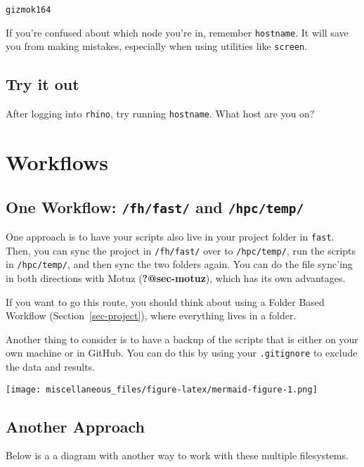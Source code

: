 \documentclass[
  letterpaper,
  DIV=11,
  numbers=noendperiod]{scrreprt}
\begin{document}
\begin{verbatim}
gizmok164
\end{verbatim}

If you're confused about which node you're in, remember
\texttt{hostname}. It will save you from making mistakes, especially
when using utilities like \texttt{screen}.

\subsection{Try it out}\label{try-it-out-4}

After logging into \texttt{rhino}, try running \texttt{hostname}. What
host are you on?

\section{Workflows}\label{workflows}

\subsection{\texorpdfstring{One Workflow: \texttt{/fh/fast/} and
\texttt{/hpc/temp/}}{One Workflow: /fh/fast/ and /hpc/temp/}}\label{one-workflow-fhfast-and-hpctemp}

One approach is to have your scripts also live in your project folder in
\texttt{fast}. Then, you can sync the project in \texttt{/fh/fast/} over
to \texttt{/hpc/temp/}, run the scripts in \texttt{/hpc/temp/}, and then
sync the two folders again. You can do the file sync'ing in both
directions with Motuz (\textbf{?@sec-motuz}), which has its own
advantages.

If you want to go this route, you should think about using a Folder
Based Workflow (Section~\ref{sec-project}), where everything lives in a
folder.

Another thing to consider is to have a backup of the scripts that is
either on your own machine or in GitHub. You can do this by using your
\texttt{.gitignore} to exclude the data and results.

\texttt{[image: miscellaneous\_files/figure-latex/mermaid-figure-1.png]}

\subsection{Another Approach}\label{another-approach}

Below is a a diagram with another way to work with these multiple
filesystems.
\end{document}
